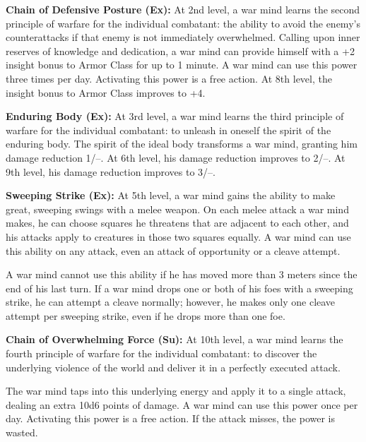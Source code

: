 {\textbf{Chain of Defensive Posture (Ex):} At 2nd level, a war mind learns the second principle of warfare for the individual combatant: the ability to avoid the enemy's counterattacks if that enemy is not immediately overwhelmed. Calling upon inner reserves of knowledge and dedication, a war mind can provide himself with a +2 insight bonus to Armor Class for up to 1 minute. A war mind can use this power three times per day. Activating this power is a free action. At 8th level, the insight bonus to Armor Class improves to +4.

\textbf{Enduring Body (Ex):} At 3rd level, a war mind learns the third principle of warfare for the individual combatant: to unleash in oneself the spirit of the enduring body. The spirit of the ideal body transforms a war mind, granting him damage reduction 1/--. At 6th level, his damage reduction improves to 2/--. At 9th level, his damage reduction improves to 3/--.

\textbf{Sweeping Strike (Ex):} At 5th level, a war mind gains the ability to make great, sweeping swings with a melee weapon. On each melee attack a war mind makes, he can choose squares he threatens that are adjacent to each other, and his attacks apply to creatures in those two squares equally. A war mind can use this ability on any attack, even an attack of opportunity or a cleave attempt.

A war mind cannot use this ability if he has moved more than 3 meters since the end of his last turn. If a war mind drops one or both of his foes with a sweeping strike, he can attempt a cleave normally; however, he makes only one cleave attempt per sweeping strike, even if he drops more than one foe.

\textbf{Chain of Overwhelming Force (Su):} At 10th level, a war mind learns the fourth principle of warfare for the individual combatant: to discover the underlying violence of the world and deliver it in a perfectly executed attack.

The war mind taps into this underlying energy and apply it to a single attack, dealing an extra 10d6 points of damage. A war mind can use this power once per day. Activating this power is a free action. If the attack misses, the power is wasted.
}